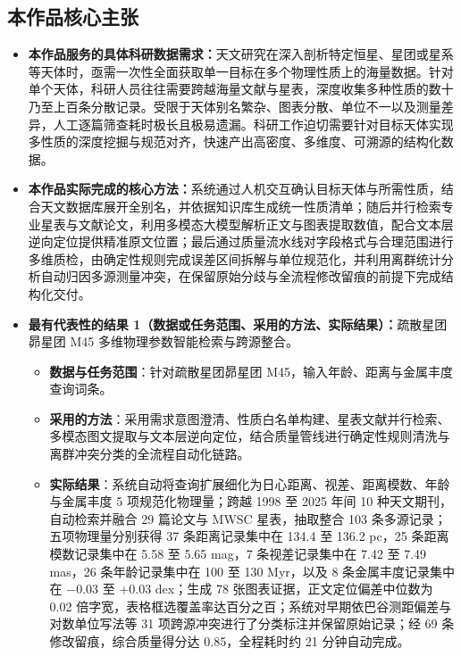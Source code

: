 \subsection{本作品核心主张}

\begin{itemize}[leftmargin=1.2em,itemsep=2pt]
\item \textbf{本作品服务的具体科研数据需求：}天文研究在深入剖析特定恒星、星团或星系等天体时，亟需一次性全面获取单一目标在多个物理性质上的海量数据。针对单个天体，科研人员往往需要跨越海量文献与星表，深度收集多种性质的数十乃至上百条分散记录。受限于天体别名繁杂、图表分散、单位不一以及测量差异，人工逐篇筛查耗时极长且极易遗漏。科研工作迫切需要针对目标天体实现多性质的深度挖掘与规范对齐，快速产出高密度、多维度、可溯源的结构化数据。
\item \textbf{本作品实际完成的核心方法：}系统通过人机交互确认目标天体与所需性质，结合天文数据库展开全别名，并依据知识库生成统一性质清单；随后并行检索专业星表与文献论文，利用多模态大模型解析正文与图表提取数值，配合文本层逆向定位提供精准原文位置；最后通过质量流水线对字段格式与合理范围进行多维质检，由确定性规则完成误差区间拆解与单位规范化，并利用离群统计分析自动归因多源测量冲突，在保留原始分歧与全流程修改留痕的前提下完成结构化交付。
\item \textbf{最有代表性的结果 1（数据或任务范围、采用的方法、实际结果）：}疏散星团昴星团 M45 多维物理参数智能检索与跨源整合。
\begin{itemize}[leftmargin=1.2em,itemsep=1pt]
\item \textbf{数据与任务范围}：针对疏散星团昴星团 M45，输入年龄、距离与金属丰度查询词条。
\item \textbf{采用的方法}：采用需求意图澄清、性质白名单构建、星表文献并行检索、多模态图文提取与文本层逆向定位，结合质量管线进行确定性规则清洗与离群冲突分类的全流程自动化链路。
\item \textbf{实际结果}：系统自动将查询扩展细化为日心距离、视差、距离模数、年龄与金属丰度 5 项规范化物理量；跨越 1998 至 2025 年间 10 种天文期刊，自动检索并融合 29 篇论文与 MWSC 星表，抽取整合 103 条多源记录；五项物理量分别获得 37 条距离记录集中在 134.4 至 136.2 pc，25 条距离模数记录集中在 5.58 至 5.65 mag，7 条视差记录集中在 7.42 至 7.49 mas，26 条年龄记录集中在 100 至 130 Myr，以及 8 条金属丰度记录集中在 $-$0.03 至 +0.03 dex；生成 78 张图表证据，正文定位偏差中位数为 0.02 倍字宽，表格框选覆盖率达百分之百；系统对早期依巴谷测距偏差与对数单位写法等 31 项跨源冲突进行了分类标注并保留原始记录；经 69 条修改留痕，综合质量得分达 0.85，全程耗时约 21 分钟自动完成。
\end{itemize}

\end{itemize}
